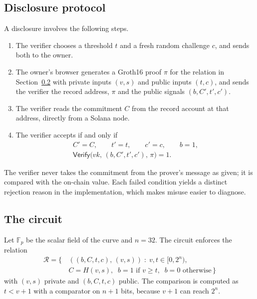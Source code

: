 \subsection{Disclosure protocol}\label{sec:protocol}

A disclosure involves the following steps.
\begin{enumerate}
  \item The verifier chooses a threshold $t$ and a fresh random challenge
  $c$, and sends both to the owner.
  \item The owner's browser generates a Groth16 proof $\pi$ for the relation
  in Section~\ref{sec:circuit} with private inputs $(v, s)$ and public inputs
  $(t, c)$, and sends the verifier the record address, $\pi$ and the public
  signals $(b, C', t', c')$.
  \item The verifier reads the commitment $C$ from the record account at
  that address, directly from a Solana node.
  \item The verifier accepts if and only if
  \begin{equation}\label{eq:accept}
  \begin{gathered}
    C' = C,\qquad t' = t,\qquad c' = c,\qquad b = 1,\\
    \mathsf{Verify}\bigl(\mathit{vk},\,(b, C', t', c'),\,\pi\bigr) = 1 .
  \end{gathered}
  \end{equation}
\end{enumerate}
The verifier never takes the commitment from the prover's message as given;
it is compared with the on-chain value. Each failed condition yields a
distinct rejection reason in the implementation, which makes misuse easier
to diagnose.

\subsection{The circuit}\label{sec:circuit}

Let $\mathbb{F}_p$ be the scalar field of the curve and $n = 32$. The circuit
enforces the relation
\begin{equation}\label{eq:relation}
\begin{aligned}
  \mathcal{R} = \bigl\{\, &((b, C, t, c),\,(v, s)) \;:\; v, t \in [0, 2^{n}),\\
  & C = H(v, s),\;\; b = 1 \text{ if } v \ge t,\;\; b = 0 \text{ otherwise} \,\bigr\}
\end{aligned}
\end{equation}
with $(v, s)$ private and $(b, C, t, c)$ public. The comparison is computed
as $t < v + 1$ with a comparator on $n + 1$ bits, because $v + 1$ can reach
$2^{n}$.

